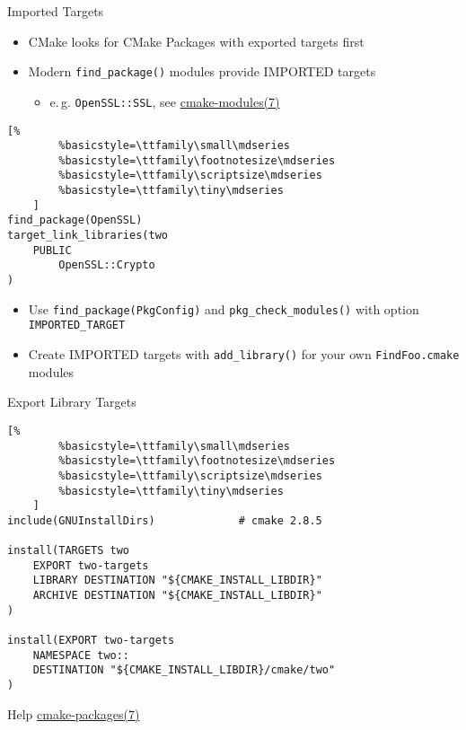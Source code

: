 \documentclass[t]{beamer}
\begin{document}
\begin{frame}[fragile]{Imported Targets}
    \begin{itemize}
        \item CMake looks for CMake Packages with exported targets first
        \item Modern \texttt{find\_package()} modules provide
            IMPORTED targets
            \begin{itemize}
                \item e.\,g. \texttt{OpenSSL::SSL}, see
                    \href{https://cmake.org/cmake/help/latest/manual/cmake-modules.7.html}{cmake-modules(7)}
            \end{itemize}
    \end{itemize}

    \begin{lstlisting}[%
        %basicstyle=\ttfamily\small\mdseries
        %basicstyle=\ttfamily\footnotesize\mdseries
        %basicstyle=\ttfamily\scriptsize\mdseries
        %basicstyle=\ttfamily\tiny\mdseries
    ]
find_package(OpenSSL)
target_link_libraries(two
    PUBLIC
        OpenSSL::Crypto
)
    \end{lstlisting}

    \begin{itemize}
        \item Use \texttt{find\_package(PkgConfig)} and
            \texttt{pkg\_check\_modules()} with option
            \texttt{IMPORTED\_TARGET}
        \item Create IMPORTED targets with \texttt{add\_library()}
            for your own \texttt{FindFoo.cmake} modules
    \end{itemize}
\end{frame}

\begin{frame}[fragile]{Export Library Targets}
    \begin{lstlisting}[%
        %basicstyle=\ttfamily\small\mdseries
        %basicstyle=\ttfamily\footnotesize\mdseries
        %basicstyle=\ttfamily\scriptsize\mdseries
        %basicstyle=\ttfamily\tiny\mdseries
    ]
include(GNUInstallDirs)				# cmake 2.8.5

install(TARGETS two
	EXPORT two-targets
	LIBRARY DESTINATION "${CMAKE_INSTALL_LIBDIR}"
	ARCHIVE DESTINATION "${CMAKE_INSTALL_LIBDIR}"
)

install(EXPORT two-targets
	NAMESPACE two::
	DESTINATION "${CMAKE_INSTALL_LIBDIR}/cmake/two"
)
    \end{lstlisting}

    \begin{block}{Help}
        \href{https://cmake.org/cmake/help/latest/manual/cmake-packages.7.html}{cmake-packages(7)}
    \end{block}
\end{frame}
\end{document}
